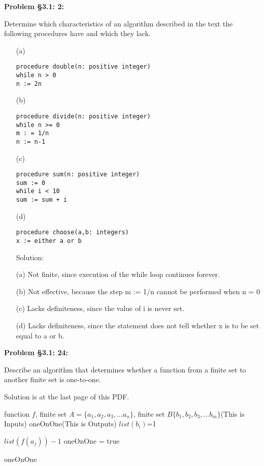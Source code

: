 \documentclass{article}
\newenvironment{problem}[1]
{\begin{mdframed}[default]
\textbf{Problem #1:}
}
{\end{mdframed}
}
\begin{document}
\begin{problem}{\S 3.1: 2}
Determine which characteristics of an algorithm described in the text the following
procedures have and which they lack.
\begin{enumerate}
\item[(a)]
\begin{verbatim}
procedure double(n: positive integer)
while n > 0
n := 2n
\end{verbatim}
\item[(b)]
\begin{verbatim}
procedure divide(n: positive integer)
while n >= 0
m : = 1/n
n := n-1
\end{verbatim}
\item[(c)]
\begin{verbatim}
procedure sum(n: positive integer)
sum := 0
while i < 10
sum := sum + i
\end{verbatim}
\item[(d)]
\begin{verbatim}
procedure choose(a,b: integers)
x := either a or b
\end{verbatim}

Solution:
\item[(a)] Not finite, since execution of the while loop continues forever.
\item[(b)] Not effective, because the step m := 1/n cannot be performed when n = 0
\item[(c)] Lacks definiteness, since the value of i is never set.
\item[(d)] Lacks definiteness, since the statement does not tell whether x is to be set equal to a or b.


\end{enumerate}
\end{problem}
\begin{problem}{\S 3.1: 24}
Describe an algorithm that determines whether a function from a finite set to
another finite set is one-to-one.

Solution is at the last page of this PDF.
\end{problem}
\begin{algorithm}[b]
    \caption{Algorithm of Problem \S 3.1:24}
    \label{alg:AOS}
    \renewcommand{\algorithmicrequire}{\textbf{Input:}}
    \renewcommand{\algorithmicensure}{\textbf{Output:}}
    
    \begin{algorithmic}[1]
        \REQUIRE function $f$, finite set $A=\{a_1, a_2,a_3,...a_n\}$, finite set $B\{b_1, b_2,b_3,...b_m\}$(This is Inputs)
        \ENSURE oneOnOne(This is Outputs)    %
            \STATE$list(b_i)$=1
        \ENDFOR
        
            \STATE$list(f(a_j))-1$
        \ENDFOR
        \STATE oneOnOne = true
            \ENDIF
        \ENDFOR
        
        
        \RETURN oneOnOne
    \end{algorithmic}
\end{algorithm}
\end{document}
